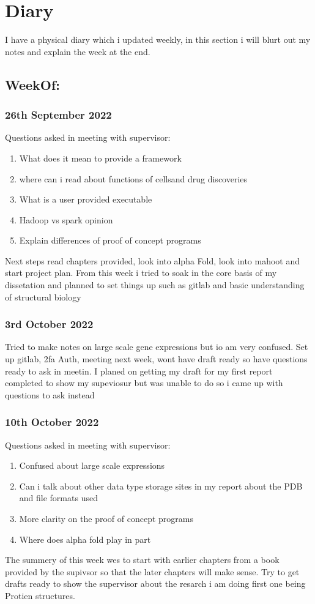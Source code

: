 \documentclass{report}
\begin{document}
\section{Diary}
I have a physical diary which i updated weekly, in this section i will blurt out my notes and explain the week at the end.
\subsection*{WeekOf:}

\subsubsection{26th September 2022}
Questions asked in meeting with supervisor: 
\begin{enumerate}
    \item What does it mean to provide a framework
    \item where can i read about functions of cellsand drug discoveries
    \item What is a user provided executable
    \item Hadoop vs spark opinion
    \item Explain differences of proof of concept programs
\end{enumerate}
Next steps read chapters provided, look into alpha Fold, look into mahoot and start project plan.
From this week i tried to soak in the core basis of my dissetation and planned to set things up such as gitlab and basic understanding of structural biology

\subsubsection{3rd October 2022}
Tried to make notes on large scale gene expressions but io am very confused. Set up gitlab, 2fa Auth, meeting next week, wont have draft ready so have questions ready to ask in meetin.
I planed on getting my draft for my first report completed to show my supeviosur but was unable to do so i came up with questions to ask instead

\subsubsection{10th October 2022}
Questions asked in meeting with supervisor: 
\begin{enumerate}
    \item Confused about large scale expressions
    \item Can i talk about other data type storage sites in my report about the PDB and file formats used
    \item More clarity on the proof of concept programs
    \item Where does alpha fold play in part
\end{enumerate}
The summery of this week wes to start with earlier chapters from a book provided by the supivsor so that the later chapters will make sense. Try to get drafts ready to show the supervisor about the resarch i am doing first one being Protien structures.
\end{document}
